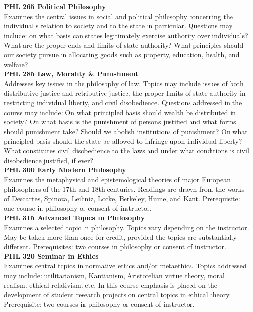 \documentclass[
  letterpaper,
]{scrbook}
\begin{document}
\textbf{PHL 265 Political Philosophy}\\
Examines the central issues in social and political philosophy
concerning the individual's relation to society and to the state in
particular. Questions may include: on what basis can states legitimately
exercise authority over individuals? What are the proper ends and limits
of state authority? What principles should our society pursue in
allocating goods such as property, education, health, and welfare?\\
\textbf{PHL 285 Law, Morality \& Punishment}\\
Addresses key issues in the philosophy of law. Topics may include issues
of both distributive justice and retributive justice, the proper limits
of state authority in restricting individual liberty, and civil
disobedience. Questions addressed in the course may include: On what
principled basis should wealth be distributed in society? On what basis
is the punishment of persons justified and what forms should punishment
take? Should we abolish institutions of punishment? On what principled
basis should the state be allowed to infringe upon individual liberty?
What constitutes civil disobedience to the laws and under what
conditions is civil disobedience justified, if ever?\\
\textbf{PHL 300 Early Modern Philosophy}\\
Examines the metaphysical and epistemological theories of major European
philosophers of the 17th and 18th centuries. Readings are drawn from the
works of Descartes, Spinoza, Leibniz, Locke, Berkeley, Hume, and Kant.
Prerequisite: one course in philosophy or consent of instructor.\\
\textbf{PHL 315 Advanced Topics in Philosophy}\\
Examines a selected topic in philosophy. Topics vary depending on the
instructor. May be taken more than once for credit, provided the topics
are substantially different. Prerequisites: two courses in philosophy or
consent of instructor.\\
\textbf{PHL 320 Seminar in Ethics}\\
Examines central topics in normative ethics and/or metaethics. Topics
addressed may include: utilitarianism, Kantianism, Aristotelian virtue
theory, moral realism, ethical relativism, etc. In this course emphasis
is placed on the development of student research projects on central
topics in ethical theory. Prerequisite: two courses in philosophy or
consent of instructor.\\
\end{document}
